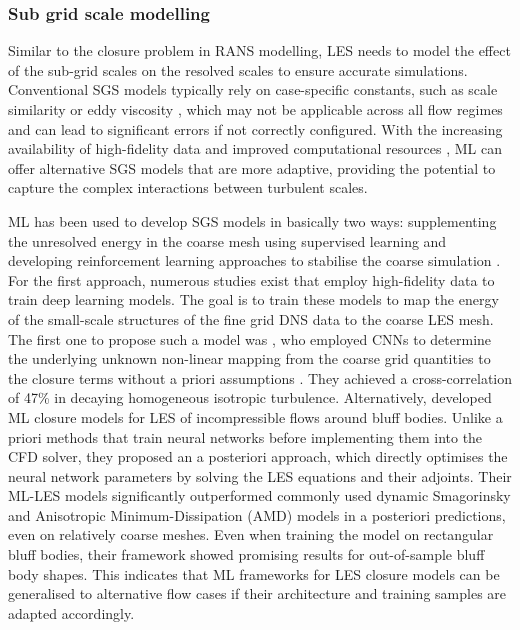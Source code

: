 \subsubsection{Sub grid scale modelling}
Similar to the closure problem in RANS modelling, LES needs to model the effect of the sub-grid scales on the resolved scales to ensure accurate simulations. Conventional SGS models typically rely on case-specific constants, such as scale similarity \cite{Bardina1980} or eddy viscosity \cite{Lilly1992, Germano1991}, which may not be applicable across all flow regimes and can lead to significant errors if not correctly configured. With the increasing availability of high-fidelity data and improved computational resources \cite{ansys2023multiGPU, Chen2009}, ML can offer alternative SGS models that are more adaptive, providing the potential to capture the complex interactions between turbulent scales. 

ML has been used to develop SGS models in basically two ways: supplementing the unresolved energy in the coarse mesh using supervised learning and developing reinforcement learning approaches to stabilise the coarse simulation \cite{Vinuesa2022}. For the first approach, numerous studies exist that employ high-fidelity data to train deep learning models. The goal is to train these models to map the energy of the small-scale structures of the fine grid DNS data to the coarse LES mesh. The first one to propose such a model was \textcite{Beck2019}, who employed CNNs to determine the underlying unknown non-linear mapping from the coarse grid quantities to the closure terms without a priori assumptions \cite{Beck2019}. They achieved a cross-correlation of 47\% in decaying homogeneous isotropic turbulence. Alternatively, \textcite{Sirignano2023} developed ML closure models for LES of incompressible flows around bluff bodies.  Unlike a priori methods that train neural networks before implementing them into the CFD solver, they proposed an a posteriori approach, which directly optimises the neural network parameters by solving the LES equations and their adjoints. Their ML-LES models significantly outperformed commonly used dynamic Smagorinsky and Anisotropic Minimum-Dissipation (AMD) \cite{Rozema2015} models in a posteriori predictions, even on relatively coarse meshes. Even when training the model on rectangular bluff bodies, their framework showed promising results for out-of-sample bluff body shapes. This indicates that ML frameworks for LES closure models can be generalised to alternative flow cases if their architecture and training samples are adapted accordingly. 


